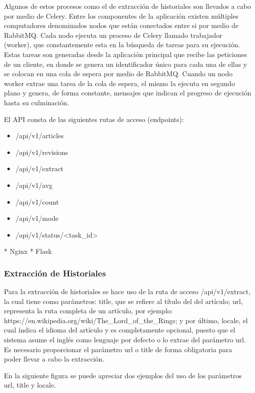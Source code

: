 Algunos de estos procesos como el de extracción de historiales son llevados a cabo por medio de Celery. Entre los componentes de la 
aplicación existen múltiples computadores denominados nodos que están conectados entre si por medio de RabbitMQ.
Cada nodo ejecuta un proceso de Celery llamado trabajador (worker), que constantemente esta en la búsqueda de tareas para su 
ejecución. Estas tareas son generadas desde la aplicación principal que recibe las peticiones de un cliente, en donde se 
genera un identificador único para cada una de ellas y se colocan en una cola de espera por medio de RabbitMQ. Cuando un nodo 
worker extrae una tarea de la cola de espera, el mismo la ejecuta en segundo plano y genera, de forma constante, mensajes que
indican el progreso de ejecución hasta su culminación.


El API consta de las siguientes rutas de acceso (endpoints):

\begin{itemize}
	\item /api/v1/articles
	\item /api/v1/revisions
	\item /api/v1/extract
	\item /api/v1/avg
	\item /api/v1/count
	\item /api/v1/mode
	\item /api/v1/status/<task_id>
\end{itemize}

* Nginx
* Flask

\subsubsection{Extracción de Historiales}

Para la extracción de historiales se hace uso de la ruta de acceso /api/v1/extract, la cual tiene como parámetros:
title, que se refiere al título del del artículo; url, representa la ruta completa de un artículo, por ejemplo: 
https://en.wikipedia.org/wiki/The_Lord_of_the_Rings; y por último, locale, el cual índica el idioma del artículo y 
es completamente opcional, puesto que el sistema asume el inglés como lenguaje por defecto o lo extrae del parámetro 
url. Es necesario proporcionar el parámetro url o title de forma obligatoria para poder llevar a cabo la extracción.

En la siguiente figura se puede apreciar dos ejemplos del uso de los parámetros url, title y locale.

